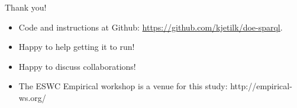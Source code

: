 \documentclass[english,usenames,dvipsnames,aspectratio=169]{beamer}
\begin{document}
\begin{frame}{Thank you!}

  \begin{itemize}
  \item Code and instructions at Github:
    \url{https://github.com/kjetilk/doe-sparql}.
  \item Happy to help getting it to run!
  \item Happy to discuss collaborations!
  \item The ESWC Empirical workshop is a venue for this study: http://empirical-ws.org/
  \end{itemize}

\end{frame}
\end{document}
